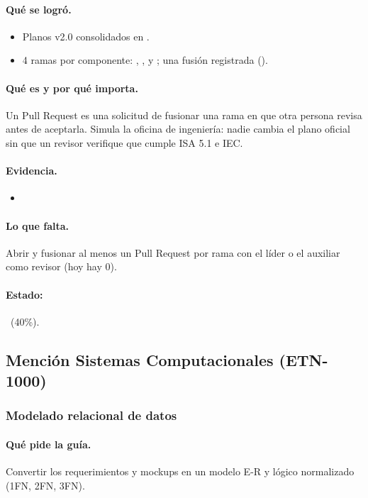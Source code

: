 \documentclass[a4paper,11pt]{article}
\begin{document}
\paragraph{Qué se logró.}
\begin{itemize}
\item Planos v2.0 consolidados en .
\item 4 ramas por componente: , ,  y ; una fusión registrada ().
\end{itemize}
\paragraph{Qué es y por qué importa.} Un Pull Request es una solicitud de fusionar una rama en  que otra persona revisa antes de aceptarla. Simula la oficina de ingeniería: nadie cambia el plano oficial sin que un revisor verifique que cumple ISA 5.1 e IEC.
\paragraph{Evidencia.}
\begin{itemize}\small
\item {}
\end{itemize}
\paragraph{Lo que falta.} Abrir y fusionar al menos un Pull Request por rama con el líder o el auxiliar como revisor (hoy hay 0).
\paragraph{Estado:} \parcial~(40\%).
\subsection{Mención Sistemas Computacionales (ETN-1000)}
\subsubsection{Modelado relacional de datos}
\paragraph{Qué pide la guía.} Convertir los requerimientos y mockups en un modelo E-R y lógico normalizado (1FN, 2FN, 3FN).
\end{document}
